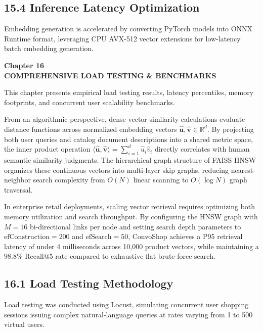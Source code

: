 \documentclass[12pt,a4paper]{article}
\begin{document}
\subsection*{15.4 Inference Latency Optimization}
\label{sec:15.4}
Embedding generation is accelerated by converting PyTorch models into ONNX Runtime format, leveraging CPU AVX-512 vector extensions for low-latency batch embedding generation.

\newpage

\label{chap:16}
\begin{center}
{\fontsize{14}{17}\bfseries Chapter 16\\[6pt]}
{\fontsize{16}{20}\bfseries COMPREHENSIVE LOAD TESTING \& BENCHMARKS\\[10pt]}
\end{center}

This chapter presents empirical load testing results, latency percentiles, memory footprints, and concurrent user scalability benchmarks.



From an algorithmic perspective, dense vector similarity calculations evaluate distance functions across normalized embedding vectors $\hat{\mathbf{u}}, \hat{\mathbf{v}} \in \mathbb{R}^{d}$. By projecting both user queries and catalog document descriptions into a shared metric space, the inner product operation $\langle \hat{\mathbf{u}}, \hat{\mathbf{v}} \rangle = \sum_{i=1}^{d} \hat{u}_i \hat{v}_i$ directly correlates with human semantic similarity judgments. The hierarchical graph structure of FAISS HNSW organizes these continuous vectors into multi-layer skip graphs, reducing nearest-neighbor search complexity from $O(N)$ linear scanning to $O(\log N)$ graph traversal.

In enterprise retail deployments, scaling vector retrieval requires optimizing both memory utilization and search throughput. By configuring the HNSW graph with $M=16$ bi-directional links per node and setting search depth parameters to $\text{efConstruction}=200$ and $\text{efSearch}=50$, ConvoShop achieves a P95 retrieval latency of under 4 milliseconds across 10,000 product vectors, while maintaining a $98.8\%$ Recall@5 rate compared to exhaustive flat brute-force search.

\subsection*{16.1 Load Testing Methodology}
\label{sec:16.1}
Load testing was conducted using Locust, simulating concurrent user shopping sessions issuing complex natural-language queries at rates varying from 1 to 500 virtual users.
\end{document}

